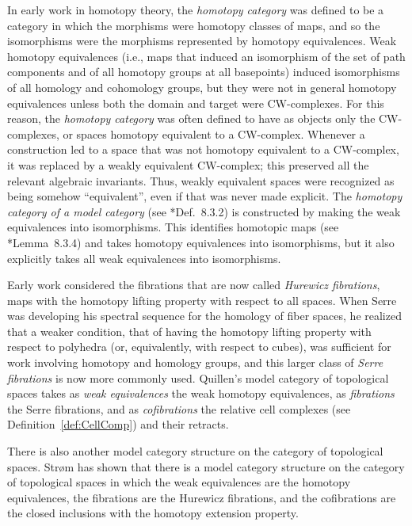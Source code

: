 \documentclass{amsart}
\numberwithin{equation}{section}
\theoremstyle{slplain}
\theoremstyle{definition}
\theoremstyle{remark}
\newcommand{\defref}{Definition~\ref}
\begin{document}
In early work in homotopy theory, the \emph{homotopy category} was
defined to be a category in which the morphisms were homotopy classes
of maps, and so the isomorphisms were the morphisms represented by
homotopy equivalences.  Weak homotopy equivalences (i.e., maps that
induced an isomorphism of the set of path components and of all
homotopy groups at all basepoints) induced isomorphisms of all
homology and cohomology groups, but they were not in general homotopy
equivalences unless both the domain and target were CW-complexes.  For
this reason, the \emph{homotopy category} was often defined to have as
objects only the CW-complexes, or spaces homotopy equivalent to a
CW-complex.  Whenever a construction led to a space that was not
homotopy equivalent to a CW-complex, it was replaced by a weakly
equivalent CW-complex; this preserved all the relevant algebraic
invariants.  Thus, weakly equivalent spaces were recognized as being
somehow ``equivalent'', even if that was never made explicit.  The
\emph{homotopy category of a model category} (see
\cite{MCATL}*{Def.~8.3.2}) is constructed by making the weak
equivalences into isomorphisms.  This identifies homotopic maps (see
\cite{MCATL}*{Lemma~8.3.4}) and takes homotopy equivalences into
isomorphisms, but it also explicitly takes all weak equivalences into
isomorphisms.

Early work considered the fibrations that are now called
\emph{Hurewicz fibrations}, maps with the homotopy lifting property
with respect to all spaces.  When Serre \cite{Serre} was developing
his spectral sequence for the homology of fiber spaces, he realized
that a weaker condition, that of having the homotopy lifting property
with respect to polyhedra (or, equivalently, with respect to cubes),
was sufficient for work involving homotopy and homology groups, and
this larger class of \emph{Serre fibrations} is now more commonly
used.  Quillen's model category of topological spaces takes as
\emph{weak equivalences} the weak homotopy equivalences, as
\emph{fibrations} the Serre fibrations, and as \emph{cofibrations} the
relative cell complexes (see \defref{def:CellComp}) and their
retracts.

There is also another model category structure on the category of
topological spaces.  Str{\o}m \cite{Strom:HC} has shown that there is
a model category structure on the category of topological spaces in
which the weak equivalences are the homotopy equivalences, the
fibrations are the Hurewicz fibrations, and the cofibrations are the
closed inclusions with the homotopy extension property.
\end{document}
